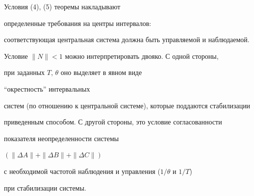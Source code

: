 Условия (4), (5) теоремы накладывают 


определенные требования на центры интервалов:


соответствующая центральная система должна быть управляемой и наблюдаемой.


Условие $\|N\| < 1$ можно интерпретировать двояко. С одной стороны,


при заданных $T$, $\theta$ оно выделяет в явном виде


``окрестность'' интервальных


систем (по отношению к центральной системе), которые поддаются стабилизации


приведенным способом. С другой стороны, это условие согласованности


показателя неопределенности системы


$( \| \Delta A \|+\| \Delta B \|+\| \Delta C \|)$


с необходимой частотой наблюдения и управления ($1/ \theta$ и $1/T$)


при стабилизации системы.





